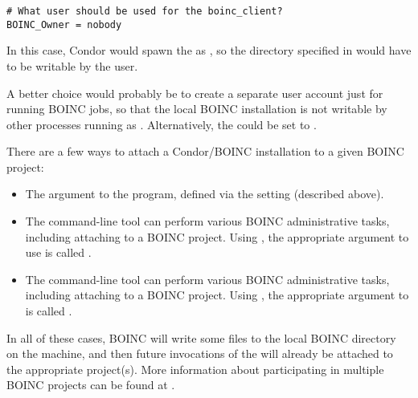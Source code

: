 \footnotesize
\begin{verbatim}
# What user should be used for the boinc_client?
BOINC_Owner = nobody
\end{verbatim}
\normalsize

In this case, Condor would spawn the  as
, so the directory specified in 
would have to be writable by the  user.

A better choice would probably be to create a separate user account
just for running BOINC jobs, so that the local BOINC installation is
not writable by other processes running as .
Alternatively, the  could be set to
. 

\noindent {}

There are a few ways to attach a Condor/BOINC installation to a given
BOINC project:
\begin{itemize}

\item The  argument to the 
  program, defined via the  setting
  (described above). 

\item The  command-line tool can perform various
  BOINC administrative tasks, including attaching to a BOINC project.
  Using , the appropriate argument to use is called
  .

\item The  command-line tool can perform various
  BOINC administrative tasks, including attaching to a BOINC project.
  Using , the appropriate argument to is called
  .

\end{itemize}

In all of these cases, BOINC will write some files to the local BOINC
directory on the machine, and then future invocations of the
 will already be attached to the appropriate
project(s).
More information about participating in multiple BOINC projects can be
found at .

